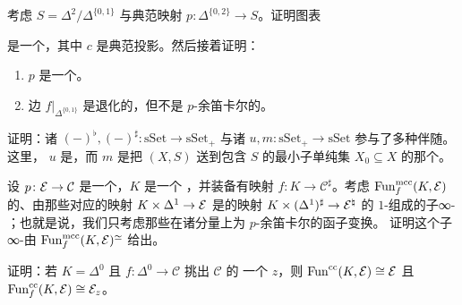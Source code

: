\begin{exercise}\label{ex:quotient-inner-fibration}
考虑\trSimplicialSet{} $S = \Delta^2/\Delta^{\{0,1\}}$ 与典范映射
$p\colon \Delta^{\{0,2\}} \to S$。证明图表
\begin{center}
\end{center}
是一个\trPullback{}，其中 $c$ 是典范投影。然后接着证明：
\begin{enumerate}[label=(\arabic*)]
  \item $p$ 是一个\trInnerFibration{}。
  \item 边 $f|_{\Delta^{\{0,1\}}}$ 是退化的，但不是 $p$-余笛卡尔的。
\end{enumerate}
\end{exercise}

\begin{exercise}\label{ex:flat-sharp-adjunctions}
证明：诸\trFunctor{} $(-)^{\flat}, (-)^{\sharp}\colon \mathrm{sSet} \to \mathrm{sSet}_+$
与诸\trFunctor{} $u, m\colon \mathrm{sSet}_+ \to \mathrm{sSet}$ 参与了多种伴随。这里，
$u$ 是\trForgetfulFunctor{}，而 $m$ 是把\trMarkedSimplicialSet{} $(X, S)$ 送到包含
$S$ 的最小子单纯集 $X_0 \subseteq X$ 的那个\trFunctor{}。
\end{exercise}

\begin{exercise}\label{ex:fun-mcc-core}
设 $p\colon \mathcal{E} \to \mathcal{C}$ 是一个\trCocartesianFibration{}，$K$ 是一个%
\trMarkedSimplicialSet{}，并装备有映射 $f\colon K \to \mathcal{C}^{\sharp}$。考虑
$\mathrm{Fun}^{\mathrm{mcc}}_f(K, \mathcal{E})$ 的、由那些对应的映射
$K \times \Delta^1 \to \mathcal{E}$ 是\trMarkedSimplicialSet{}的映射
$K \times (\Delta^1)^{\sharp} \to \mathcal{E}^{\natural}$ 的 $1$-\trSimplex{}组成的子∞-%
\trCategory{}；也就是说，我们只考虑那些在诸分量上\trPointwise{}为 $p$-余笛卡尔的函子变换。
证明这个子∞-\trCategory{}由 $\mathrm{Fun}^{\mathrm{mcc}}_f(K, \mathcal{E})^{\simeq}$ 给出。
\end{exercise}

\begin{exercise}\label{ex:fun-cc-over-z}
证明：若 $K = \Delta^0$ 且 $f\colon \Delta^0 \to \mathcal{C}$ 挑出 $\mathcal{C}$ 的
一个\trObject{} $z$，则 $\mathrm{Fun}^{\mathrm{cc}}(K, \mathcal{E}) \cong \mathcal{E}$ 且
$\mathrm{Fun}^{\mathrm{cc}}_f(K, \mathcal{E}) \cong \mathcal{E}_z$。
\end{exercise}

